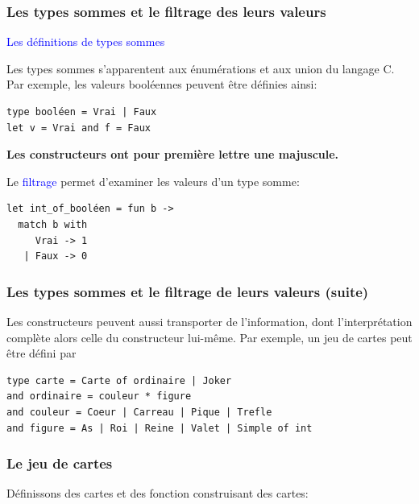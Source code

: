 %
\begin{frame}[containsverbatim]
\frametitle{Les types sommes et le filtrage des leurs valeurs}

\textcolor{blue}{Les définitions de types sommes}

\bigskip

Les types sommes s'apparentent aux énumérations et aux \textsf{union}
du langage C. Par exemple, les valeurs booléennes peuvent être
définies ainsi: {\small
\begin{verbatim}
type booléen = Vrai | Faux
let v = Vrai and f = Faux
\end{verbatim}
}
\textbf{Les constructeurs ont pour première lettre une majuscule.}

\bigskip

Le \textcolor{blue}{filtrage} permet d'examiner les valeurs d'un type
somme:
{\small
\begin{verbatim}
let int_of_booléen = fun b ->
  match b with
     Vrai -> 1
   | Faux -> 0
\end{verbatim}
}

\end{frame}

%
\begin{frame}[containsverbatim]
\frametitle{Les types sommes et le filtrage de leurs valeurs (suite)}

Les constructeurs peuvent aussi transporter de l'information, dont
l'interprétation complète alors celle du constructeur lui-même. Par
exemple, un jeu de cartes peut être défini par
{\small
\begin{verbatim}
type carte = Carte of ordinaire | Joker
and ordinaire = couleur * figure
and couleur = Coeur | Carreau | Pique | Trefle
and figure = As | Roi | Reine | Valet | Simple of int
\end{verbatim}
}

\end{frame}

%
\begin{frame}
\frametitle{Le jeu de cartes}

Définissons des cartes et des fonction construisant des cartes:

\bigskip







\end{frame}

